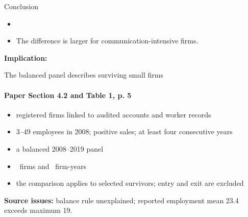 \documentclass[11pt,aspectratio=169]{beamer}
\begin{document}
\begin{frame}{Conclusion}
  \hypertarget{main:conclusion}{}%
  \medskip
  \begin{itemize}\setlength{\itemsep}{1.45em}
    \item {}
    \item The difference is larger for \textcolor{cTasks}{communication-intensive firms}.
  \end{itemize}

  \vspace{1.65em}
  \textbf{Implication:} \ResultImplicationSlide
\end{frame}

\AppendixStart

\begin{frame}[t]{The balanced panel describes surviving small firms}
  \hypertarget{app:sample}{}%
  \framesubtitle{Paper Section 4.2 and Table 1, p. 5}
  \medskip
  \begin{itemize}\setlength{\itemsep}{0.58em}
    \item {} registered firms linked to audited accounts and worker records
    \item {} 3--49 employees in 2008; positive sales; at least four consecutive years
    \item {} a balanced 2008--2019 panel
    \item {} \ResFirms\ firms and \ResFirmYears\ firm-years
    \item {} the comparison applies to selected survivors; entry and exit are excluded
  \end{itemize}
  \bigskip
  {\small\color{gray}\textbf{Source issues:} balance rule unexplained; reported employment mean 23.4 exceeds maximum 19.}
\end{frame}
\end{document}
